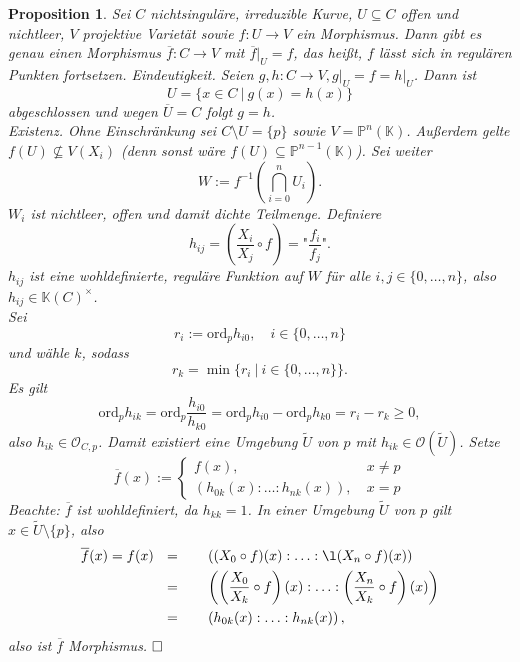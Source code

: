 \documentclass[11pt]{book}
\newtheorem{prop}[theorem]{Proposition}
\theoremstyle{nonumberbreak}
\newenvironment{pr}[1][]{\ifthenelse{\equal{#1}{}}{\proof}{\proof[#1]}\rm}{\endproof}
\begin{document}
\begin{spacing}{1.3}
\begin{prop}
Sei $C$ nichtsinguläre, irreduzible Kurve, $U \subseteq C$ offen und nichtleer, $V$ projektive Varietät sowie $f: U \longrightarrow V$ ein Morphismus. Dann gibt es genau einen Morphismus $ \overline{f}: C \longrightarrow V$ mit $\overline{f}\vert_{U} = f$, das heißt, $f$ lässt sich in regulären Punkten fortsetzen.
\begin{pr}
\textit{Eindeutigkeit.} Seien $g,h: C \longrightarrow V, g\vert_{U}=f= h \vert_{U}$. Dann ist 
$$U= \{x \in C \ \vert \ g(x)=h(x) \}$$
abgeschlossen und wegen $\overline{U} = C$ folgt $g=h$. \\
\textit{Existenz.} Ohne Einschränkung sei $C \setminus U = \{p\}$ sowie $V = \mathbb{P}^n(\mathbb{K})$. Außerdem gelte $f(U) \nsubseteq V(X_i)$ (denn sonst wäre $f(U) \subseteq \mathbb{P}^{n-1}(\mathbb{K})$). Sei weiter
$$W:= f^{-1} \left( \bigcap_{i=0}^n U_i \right).$$
$W_i$ ist nichtleer, offen und damit dichte Teilmenge. Definiere
$$h_{ij} = \left( \frac{X_i}{X_j} \circ f \right) = \textrm{"} \frac{f_i}{f_j} \textrm{"}.$$
$h_{ij}$ ist eine wohldefinierte, reguläre Funktion auf $W$ für alle $i,j \in \{0, \ldots, n \}$, also $h_{ij} \in \mathbb{K}(C)^{\times}$. \\
Sei $$r_i := \textrm{ord}_p h_{i0}, \quad i \in \{0, \ldots, n \}$$
und wähle $k$, sodass
$$r_k = \min \{ r_i \ \vert \ i \in \{0, \ldots, n \} \}.$$
Es gilt
$$\textrm{ord}_p h_{ik} = \textrm{ord}_p \frac{h_{i0}}{h_{k0}} = \textrm{ord}_p h_{i0} - \textrm{ord}_p h_{k0} = r_i - r_k \geqslant 0, $$
also $h_{ik} \in \mathcal{O}_{C,p}$. Damit existiert eine Umgebung $\tilde{U}$ von $p$ mit $h_{ik} \in \mathcal{O}(\tilde{U})$. Setze 
$$\overline{f}(x) := \begin{cases} f(x), & \ x \neq p \\ (h_{0k}(x): \ldots : h_{nk}(x) ), & \ x=p \end{cases}$$
Beachte: $\overline{f}$ ist wohldefiniert, da $h_{kk}=1$. In einer Umgebung $\tilde{U}$ von $p$ gilt $x \in \tilde{U} \setminus \{p\}$, also
\begin{alignat*}{5}
\overline{f}(x) = f(x) \ \ &=&& \quad  \left( (X_0 \circ f )(x) : \ldots : \l(X_n \circ f)(x) \right)\\
&=&& \quad \left( \left( \frac{X_0}{X_k} \circ f \right) (x) : \ldots : \left( \frac{X_n}{X_k} \circ f \right) (x) \right)\\
&=&& \quad \left( h_{0k}(x): \ldots : h_{nk}(x) \right),
\end{alignat*}
also ist $\overline{f}$ Morphismus. $\hfill \Box$
\end{pr}
\end{prop}


\end{spacing}
\end{document}
